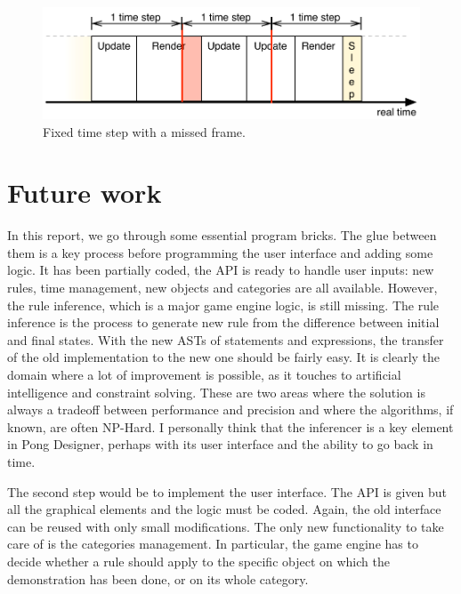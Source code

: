 \documentclass[11pt,a4paper]{article}
\begin{document}
\begin{figure}[h]
\centering
\includegraphics[scale = 0.8]{images/missFrame} 
\caption{Fixed time step with a missed frame.}
\label{fig:missFrame}
\end{figure}

\clearpage
\section{Future work}
In this report, we go through some essential program bricks. The glue between them is a key process before programming the user interface and adding some logic. It has been partially coded, the API is ready to handle user inputs: new rules, time management, new objects and categories are all available. However, the rule inference, which is a major game engine logic, is still missing. The rule inference is the process to generate new rule from the difference between initial and final states. With the new ASTs of statements and expressions, the transfer of the old implementation to the new one should be fairly easy. It is clearly the domain where a lot of improvement is possible, as it touches to artificial intelligence and constraint solving. These are two areas where the solution is always a tradeoff between performance and precision and where the algorithms, if known, are often NP-Hard. I personally think that the inferencer is a key element in Pong Designer, perhaps with its user interface and the ability to go back in time.

The second step would be to implement the user interface. The API is given but all the graphical elements and the logic must be coded. Again, the old interface can be reused with only small modifications. The only new functionality to take care of is the categories management. In particular, the game engine has to decide whether a rule should apply to the specific object on which the demonstration has been done, or on its whole category.
\end{document}
